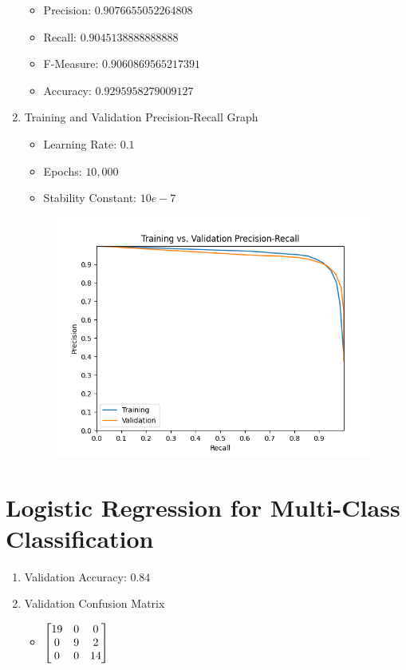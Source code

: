 \documentclass[12pt]{article}
\begin{document}
\begin{enumerate}
   \begin{itemize}
    \item Precision: $0.9076655052264808$
     \item Recall: $0.9045138888888888$
     \item F-Measure: $0.9060869565217391$
     \item Accuracy: $0.9295958279009127$
   \end{itemize}
   \item Training and Validation Precision-Recall Graph
   \begin{itemize}
     \item Learning Rate: $0.1$
     \item Epochs: $10,000$
     \item Stability Constant: $10e-7$
   \end{itemize}
    \begin{figure}[H]
        \begin{center}
        \includegraphics{images/training_validation_precision_recall_graph.png}
        \label{GD}
        \end{center}
    \end{figure}
\end{enumerate}

\newpage
\section{Logistic Regression for Multi-Class Classification}\label{naive}
\begin{enumerate}
   \item Validation Accuracy: $0.84$
   \item Validation Confusion Matrix
   \begin{itemize}
     \item $
        \begin{bmatrix}
        19 & 0 & 0\\
        0 & 9 & 2\\
        0 & 0 & 14
        \end{bmatrix}\\$
   \end{itemize}
\end{enumerate}
\end{document}
